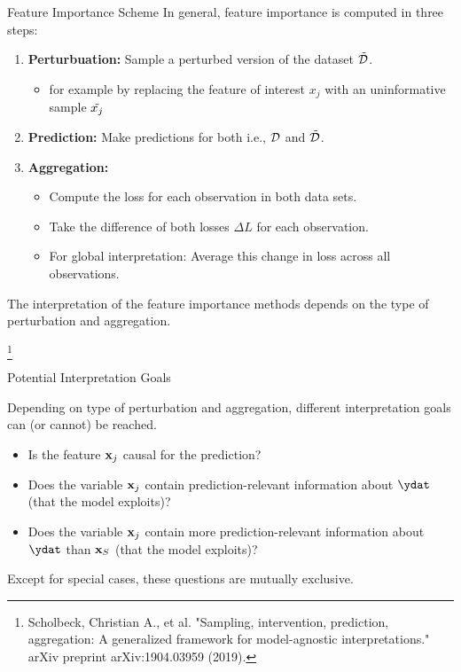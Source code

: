 \documentclass[11pt,compress,t,notes=noshow, xcolor=table]{beamer}
\begin{document}
\begin{vbframe}{Feature Importance Scheme}
In general, feature importance is computed in three steps:
\lz
\begin{enumerate}
  \item \textbf{Perturbuation:} Sample a perturbed version of the dataset $\pert{\D}{}{}$.
  \begin{itemize}
    \item for example by replacing the feature of interest $x_j$ with an uninformative sample $\pert{x_j}{}{}$
    \end{itemize}
  \item \textbf{Prediction:} Make predictions for both i.e., $\D$ and $\pert{\D}{}{}$.
  \item \textbf{Aggregation:} 
    \begin{itemize}
      \item Compute the loss for each observation in both data sets.
      \item Take the difference of both losses $\Delta L$ for each observation.
      \item For global interpretation: Average this change in loss across all observations.
    \end{itemize}
\end{enumerate}
\lz
The interpretation of the feature importance methods depends on the type of perturbation and aggregation.

\footnote[frame]{Scholbeck, Christian A., et al. "Sampling, intervention, prediction, aggregation: A generalized framework for model-agnostic interpretations." arXiv preprint arXiv:1904.03959 (2019).}
\end{vbframe}


\begin{vbframe}{Potential Interpretation Goals}

Depending on type of perturbation and aggregation, different interpretation goals can (or cannot) be reached.
\lz
\begin{itemize}
    \item Is the feature $\xj$ causal for the prediction?
    \item Does the variable $\xj$ contain prediction-relevant information about $\ydat$ (that the model exploits)?
    \item Does the variable $\xj$ contain more prediction-relevant information about $\ydat$ than $\xv_S$ (that the model exploits)?
\end{itemize}
\lz
Except for special cases, these questions are mutually exclusive.
\end{vbframe}
\end{document}
